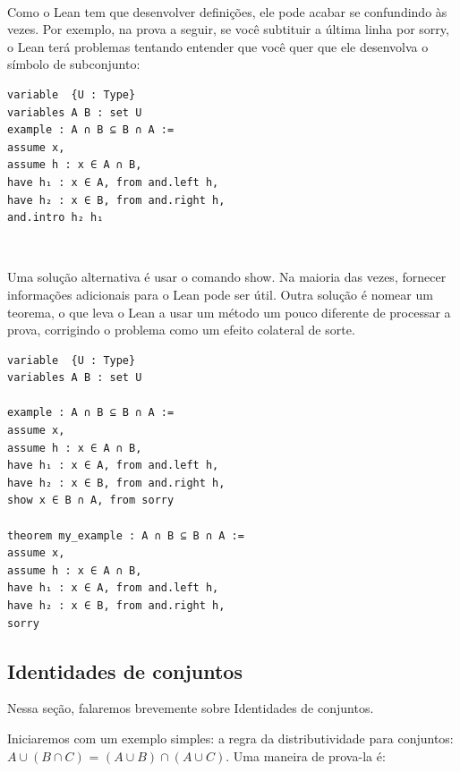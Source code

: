 $\qquad$

Como o Lean tem que desenvolver definições, ele pode acabar se confundindo às vezes. Por exemplo, na prova a seguir, se você subtituir a última linha por{
\selectfont sorry}, o Lean terá problemas tentando entender que você quer que ele desenvolva o símbolo de subconjunto:

\begin{lstlisting}
variable  {U : Type}
variables A B : set U
example : A ∩ B ⊆ B ∩ A :=
assume x,
assume h : x ∈ A ∩ B,
have h₁ : x ∈ A, from and.left h,
have h₂ : x ∈ B, from and.right h,
and.intro h₂ h₁

\end{lstlisting}

$\qquad$

Uma solução alternativa é usar o comando{
\selectfont show}. Na maioria das vezes, fornecer informações adicionais para o Lean pode ser útil. Outra solução é nomear um teorema, o que leva o Lean a usar um método um pouco diferente de processar a prova, corrigindo o problema como um efeito colateral de sorte.

\begin{lstlisting}
variable  {U : Type}
variables A B : set U

example : A ∩ B ⊆ B ∩ A :=
assume x,
assume h : x ∈ A ∩ B,
have h₁ : x ∈ A, from and.left h,
have h₂ : x ∈ B, from and.right h,
show x ∈ B ∩ A, from sorry

theorem my_example : A ∩ B ⊆ B ∩ A :=
assume x,
assume h : x ∈ A ∩ B,
have h₁ : x ∈ A, from and.left h,
have h₂ : x ∈ B, from and.right h,
sorry

\end{lstlisting}

\subsection{Identidades de conjuntos}

Nessa seção, falaremos brevemente sobre Identidades de conjuntos.

Iniciaremos com um exemplo simples: a regra da distributividade para conjuntos: $A \cup (B \cap C)$ = $(A \cup B) \cap (A \cup C)$. Uma maneira de prova-la é:


